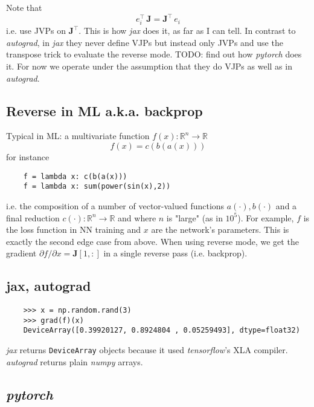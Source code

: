 \documentclass[paper=a4,11pt,headsepline]{scrartcl}
\newcommand{\ve}[1]{\ensuremath{\bm{\mathit{#1}}}}
\newcommand{\ma}[1]{\ensuremath{\bm{\mathbf{#1}}}}
\newcommand{\ra}{\ensuremath{\rightarrow}}
\newcommand{\pdi}[2]{\partial #1/\partial #2}
\newcommand{\soft}[1]{\textsl{#1}\xspace}
\newcommand{\numpy}{\soft{numpy}}
\newcommand{\pytorch}{\soft{pytorch}}
\newcommand{\jax}{\soft{jax}}
\newcommand{\autograd}{\soft{autograd}}
\newcommand{\tf}{\soft{tensorflow}}
\newcommand{\co}[1]{\texttt{#1}}
\begin{document}
Note that
\begin{equation*}
    \ve e_i^\top\,\ma J = \ma J^\top\,\ve e_i
\end{equation*}
i.e. use JVPs on $\ma J^\top$. This is how \jax does it, as far as I
can tell. In contrast to \autograd, in \jax they never define
VJPs but instead only JVPs and use the transpose trick to evaluate the reverse
mode. TODO: find out how \pytorch does it. For now we operate under the
assumption that they do VJPs as well as in \autograd.

\subsection{Reverse in ML a.k.a. backprop}

Typical in ML: a multivariate function $f(\ve x): \mathbb R^n\ra \mathbb R$
\begin{equation*}
    f(\ve x) = c(\ve b(\ve a(\ve x)))
\end{equation*}
for instance
\begin{verbatim}
    f = lambda x: c(b(a(x)))
    f = lambda x: sum(power(sin(x),2))
\end{verbatim}
i.e. the composition of a number of vector-valued functions $\ve a(\cdot), \ve
b(\cdot)$ and a final reduction $c(\cdot): \mathbb R^n\ra \mathbb R$ and where
$n$ is "large" (as in $10^5$). For example, $f$ is the loss function in NN
training and $\ve x$ are the network's parameters. This is exactly the second
edge case from above. When using reverse mode, we get the gradient $\pdi{f}{\ve
x} = \ma J[1,:]$ in a single reverse pass (i.e. backprop).

\subsection{jax, autograd}

\begin{verbatim}
    >>> x = np.random.rand(3)
    >>> grad(f)(x)
    DeviceArray([0.39920127, 0.8924804 , 0.05259493], dtype=float32)
\end{verbatim}

\jax returns \co{DeviceArray} objects because it used \tf's XLA compiler.
\autograd returns plain \numpy arrays.

\subsection{\pytorch}
\end{document}
